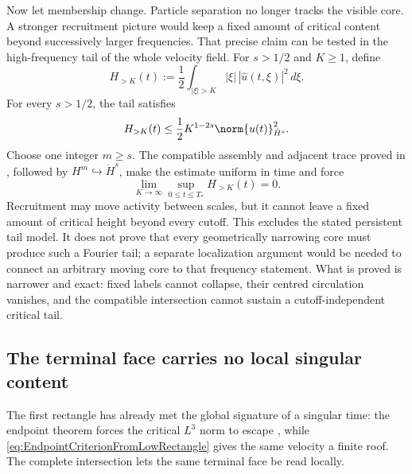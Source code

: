 Now let membership change.  Particle separation no longer tracks the visible
core.  A stronger recruitment picture would keep a fixed amount of critical
content beyond successively larger frequencies.  That precise claim can be
tested in the high-frequency tail of the whole velocity field.
For \(s>1/2\) and \(K\geq1\), define
\[
  H_{>K}(t)
  :=\frac12\int_{|\xi|>K}
  |\xi|\,|\widehat u(t,\xi)|^2\,d\xi.
\]
For every \(s>1/2\), the tail satisfies
\begin{equation}\label{eq:BodyUltravioletCriticalTail}
  H_{>K}(t)
  \leq
  \frac12K^{1-2s}\norm{u(t)}_{\dot H^s}^2.
\end{equation}
Choose one integer \(m\geq s\).  The compatible assembly and adjacent trace
proved in ,
followed by \(H^m\hookrightarrow\dot H^s\), make the estimate uniform in time
and force
\begin{equation}\label{eq:BodyUniformUltravioletVanishing}
  \lim_{K\to\infty}
  \sup_{0\leq t\leq T_*}H_{>K}(t)=0.
\end{equation}
Recruitment may move activity between scales, but it cannot leave a fixed amount
of critical height beyond every cutoff.  This excludes the stated persistent
tail model.  It does not prove that every geometrically narrowing core must
produce such a Fourier tail; a separate localization argument would be needed
to connect an arbitrary moving core to that frequency statement.  What is
proved is narrower and exact: fixed labels cannot collapse, their centred
circulation vanishes, and the compatible intersection cannot sustain a
cutoff-independent critical tail.

\subsection{The terminal face carries no local singular content}\label{sub:TheLocalSingularityPictureCloses}

The first rectangle has already met the global signature of a singular time:
the endpoint theorem forces the critical \(L^3\) norm to escape
\parencite{EscauriazaSereginSverak2003}, while
\eqref{eq:EndpointCriterionFromLowRectangle} gives the same velocity a finite
roof.  The complete intersection lets the same terminal face be read locally.

